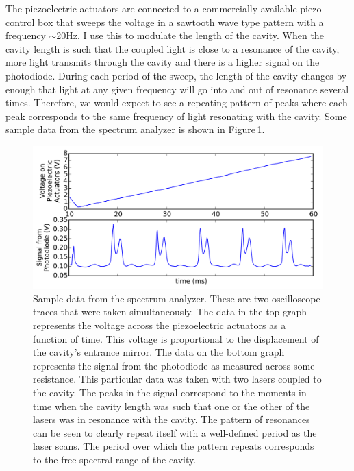 The piezoelectric actuators are connected to a commercially available piezo control box that sweeps the voltage in a sawtooth wave type pattern with a frequency $\sim$20Hz. I use this to modulate the length of the cavity. When the cavity length is such that the coupled light is close to a resonance of the cavity, more light transmits through the cavity and there is a higher signal on the photodiode. During each period of the sweep, the length of the cavity changes by enough that light at any given frequency will go into and out of resonance several times. Therefore, we would expect to see a repeating pattern of peaks where each peak corresponds to the same frequency of light resonating with the cavity. Some sample data from the spectrum analyzer is shown in Figure\,\ref{spectAnExample}.

\begin{figure}
    \centerline{\includegraphics[width=1\textwidth]{figure1.png}}
    \caption[Sample spectrum analyzer data]{\label{spectAnExample}
Sample data from the spectrum analyzer. These are two oscilloscope traces that were taken simultaneously. The data in the top graph represents the voltage across the piezoelectric actuators as a function of time. This voltage is proportional to the displacement of the cavity's entrance mirror. The data on the bottom graph represents the signal from the photodiode as measured across some resistance. This particular data was taken with two lasers coupled to the cavity. The peaks in the signal correspond to the moments in time when the cavity length was such that one or the other of the lasers was in resonance with the cavity. The pattern of resonances can be seen to clearly repeat itself with a well-defined period as the laser scans. The period over which the pattern repeats corresponds to the free spectral range of the cavity. 
    }
\end{figure}

